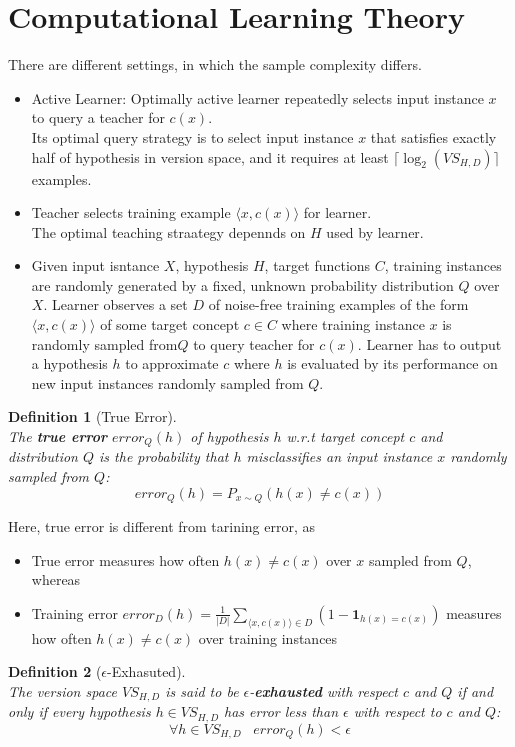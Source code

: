 \documentclass[12pt]{article}
\newtheorem{definition}{Definition}[section]
\theoremstyle{definition}
\begin{document}
\section{Computational Learning Theory}
There are different settings, in which the sample complexity differs.
\begin{itemize}
	\item Active Learner: Optimally active learner repeatedly selects input instance $x$ to query a teacher for $c(x)$. \\Its optimal query strategy is to select input instance $x$ that satisfies exactly half of hypothesis in version space, and it requires at least $\lceil \log_2(VS_{H,D})\rceil$ examples.
	\item Teacher selects training example $\langle x, c(x)\rangle$ for learner.\\
	The optimal teaching straategy depennds on $H$ used by learner.
	\item Given input isntance $X$, hypothesis $H$, target functions $C$, training instances are randomly generated by a fixed, unknown probability distribution $Q$ over $X$. Learner observes a set $D$ of noise-free training examples of the form $\langle x, c(x)\rangle$ of some target concept $c\in C$ where training instance $x$ is randomly sampled from$Q$ to query teacher for $c(x)$. Learner has to output a hypothesis $h$ to approximate $c$ where $h$ is evaluated by its performance on new input instances randomly sampled from $Q$.
\end{itemize}
\begin{definition}[True Error]
\hfill\\\normalfont The \textbf{true error} $\textit{error}_Q(h)$ of hypothesis $h$ w.r.t target concept $c$ and distribution $Q$ is the probability that $h$ misclassifies an input instance $x$ randomly sampled from $Q$:
\[
\textit{error}_Q(h)=P_{x\sim Q}(h(x)\neq c(x))
\]
\end{definition}
Here, true error is different from tarining error, as 
\begin{itemize}
	\item True error measures how often $h(x)\neq c(x)$ over $x$ sampled from $Q$, whereas
	\item Training error $\textit{error}_D(h)=\frac{1}{|D|}\sum_{\langle x, c(x)\rangle\in D}(1-\mathbf{1}_{h(x)=c(x)})$ measures how often $h(x)\neq c(x)$ over training instances
\end{itemize}
\begin{definition}[{$\epsilon$}-Exhasuted]
\hfill\\\normalfont The version space $VS_{H, D}$ is said to be $\epsilon$-\textbf{exhausted} with respect $c$ and $Q$ \textit{if and only if} every hypothesis $h\in VS_{H, D}$ has error less than $\epsilon$ with respect to $c$ and $Q$:
\[
\forall h\in VS_{H, D}\;\;\;\textit{error}_Q(h)<\epsilon
\]
\end{definition}
\end{document}
